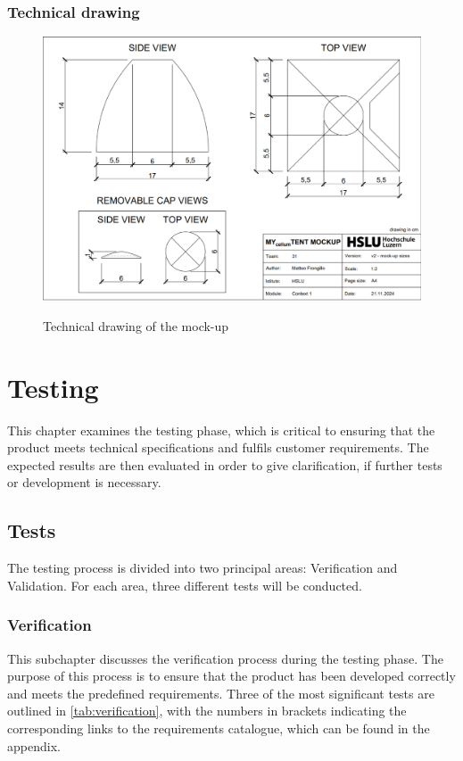 \documentclass{article}
\begin{document}
\subsubsection{Technical drawing}
\begin{figure}[ht!]
    \centering
    \includegraphics[width=\textwidth]{media/tent_plane.png}
    \label{fig:tent_plan}
    \caption{Technical drawing of the mock-up}
\end{figure}

\section{Testing}
This chapter examines the testing phase, which is critical to ensuring that the product
meets technical specifications and fulfils customer requirements. The expected results are
then evaluated in order to give clarification, if further tests or development is necessary.

\subsection{Tests}
The testing process is divided into two principal areas: Verification and Validation.
For each area, three different tests will be conducted.

\subsubsection{Verification}
This subchapter discusses the verification process during the testing phase. The purpose
of this process is to ensure that the product has been developed correctly and meets the
predefined requirements. Three of the most significant tests are outlined in 
\autoref{tab:verification}, with the numbers in brackets indicating the
corresponding links to the requirements catalogue, which can be found in the appendix.
\end{document}
